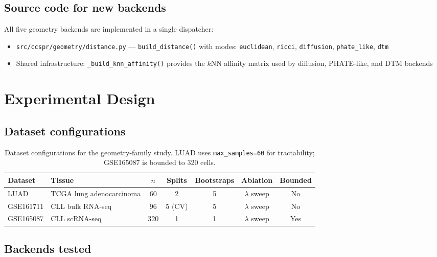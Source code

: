 \documentclass[11pt]{article}
\begin{document}
\subsection{Source code for new backends}
All five geometry backends are implemented in a single dispatcher:
\begin{itemize}[leftmargin=1.5em]
\item \texttt{src/ccspr/geometry/distance.py} --- \texttt{build\_distance()} with modes: \texttt{euclidean}, \texttt{ricci}, \texttt{diffusion}, \texttt{phate\_like}, \texttt{dtm}
\item Shared infrastructure: \texttt{\_build\_knn\_affinity()} provides the $k$NN affinity matrix used by diffusion, PHATE-like, and DTM backends
\end{itemize}

\section{Experimental Design}
\label{sec:design}

\subsection{Dataset configurations}

\begin{table}[h]
\centering
\small
\begin{tabular}{llccccc}
\toprule
Dataset & Tissue & $n$ & Splits & Bootstraps & Ablation & Bounded \\
\midrule
LUAD & TCGA lung adenocarcinoma & 60 & 2 & 5 & $\lambda$ sweep & No \\
GSE161711 & CLL bulk RNA-seq & 96 & 5 (CV) & 5 & $\lambda$ sweep & No \\
GSE165087 & CLL scRNA-seq & 320 & 1 & 1 & $\lambda$ sweep & Yes \\
\bottomrule
\end{tabular}
\caption{Dataset configurations for the geometry-family study.
LUAD uses \texttt{max\_samples=60} for tractability; GSE165087 is bounded to 320 cells.}
\label{tab:configs}
\end{table}

\subsection{Backends tested}
\end{document}
